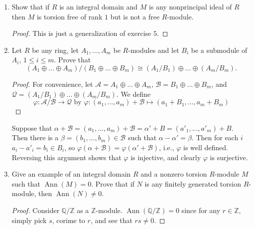 \documentclass{report}
\newcommand{\Z}{\mathbb{Z}}
\newcommand{\Q}{\mathbb{Q}}
\DeclareMathOperator{\An}{Ann}
\DeclareMathOperator{\rk}{rank}
\begin{document}
\begin{enumerate}
\begin{proof}
			Let $x_1=\alpha_1(2)+\beta_1(x)$  and $x_2=\alpha_2(2)+\beta_2(x)$, where $\alpha_1,\alpha_2,\beta_1,\beta_2\in \Z$.
			Similarly, for any $a,b\in M\setminus\{0\}$, $b(a)-a(b)=0$, so no two nontrivial elements are linearly independent.
			However, for any $m,n\in M$, $ma+n0=0$ iff $m=0$, so nontrivial vectors are linearly independent form $0$, hence $\rk M=1$.
			If $M$ had a free rank of $1$, it would be isomorphic to $R$, i.e., $M=aR$ for some $a\in R$.
			If so, then we have $ar=2$ for some $r\in R$. Thus, $a\in \{\pm 1, \pm 2\}$, but clearly, $a\neq \pm 1$, since $M\neq R$.
			However if $a=2$, then $x=2r$ for some $r\in R$, but no such $r$ exists. Thus, $M$ does not have free rank $1$.
		\end{proof}
	\item Show that if $R$ is an integral domain and $M$ is any nonprincipal ideal of $R$ then $M$ is torsion free of rank $1$ but is not a free $R$-module.
		\begin{proof}
			This is just a generalization of exercise $5$. 
		\end{proof}
	\item Let $R$ be any ring, let $A_1,...,A_m$ be $R$-modules and let $B_i$ be a submodule of $A_i$, $1\leq i \leq m$. Prove that
		$$(A_1\oplus...\oplus A_m) / (B_1\oplus ... \oplus B_m) \cong (A_1 / B_1)\oplus ... \oplus (A_m / B_m).$$
		\begin{proof}
			For convenience, let $\mathcal{A}=A_1\oplus...\oplus A_m$, $\mathcal{B}=B_1\oplus...\oplus B_m$, and $\mathcal{Q}=(A_1 / B_1)\oplus...\oplus(A_m / B_m)$. We define
			$$\varphi:\mathcal{A} / \mathcal{B}\to \mathcal{Q}\text{ by }\varphi: (a_1,...,a_m) +\mathcal{B} \mapsto (a_1+B_1,...,a_m+B_m)$$
		\end{proof}
		Suppose that $\alpha+\mathcal{B} = (a_1,...,a_m)+\mathcal{B}=\alpha' + B =(a'_1,...,a'_m)+B$. Then there is a $\beta = (b_1,...,b_m)\in\mathcal{B}$ such that $\alpha-\alpha'=\beta$.
		Then for each $i$ $a_i-a'_i=b_i\in B_i$, so $\varphi(\alpha+\mathcal{B})=\varphi(\alpha'+\mathcal{B})$, i.e., $\varphi$ is well defined.
		Reversing this argument shows that $\varphi$ is injective, and clearly $\varphi$ is surjective.
		\setcounter{enumi}{8}
	\item Give an example of an integral domain $R$ and a nonzero torsion $R$-module $M$ such that $\An(M)=0$. 
		Prove that if $N$ is any finitely generated torsion $R$-module, then $\An(N)\neq 0$.
		\begin{proof}
			Consider $\Q / \Z$ as a $\Z$-module. $\An(\Q / \Z)=0$ since for any $r\in \Z$, simply pick $s$, corime to $r$, and see that $rs\neq 0$.
			\newline


\end{proof}
\end{enumerate}
\end{document}
